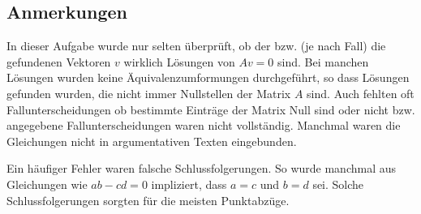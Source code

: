 \documentclass[a4paper]{article}
\begin{document}
\subsection{Anmerkungen}

In dieser Aufgabe wurde nur selten überprüft, ob der bzw. (je nach Fall) die gefundenen Vektoren $v$ wirklich Lösungen von $Av=0$ sind. Bei manchen Lösungen wurden keine Äquivalenzumformungen durchgeführt, so dass Lösungen gefunden wurden, die nicht immer Nullstellen der Matrix $A$ sind. Auch fehlten oft Fallunterscheidungen ob bestimmte Einträge der Matrix Null sind oder nicht bzw. angegebene Fallunterscheidungen waren nicht vollständig. Manchmal waren die Gleichungen nicht in argumentativen Texten eingebunden.

Ein häufiger Fehler waren falsche Schlussfolgerungen. So wurde manchmal aus Gleichungen wie $ab-cd=0$ impliziert, dass $a=c$ und $b=d$ sei. Solche Schlussfolgerungen sorgten für die meisten Punktabzüge.
\end{document}
